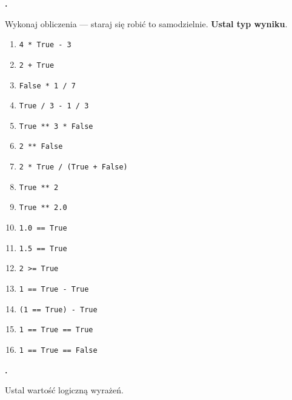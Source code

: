 \documentclass[a4paper]{article}
\begin{document}
\textbf{.}\addtocounter{zadanie}{1} Wykonaj obliczenia --- staraj się robić to samodzielnie. \textbf{Ustal typ wyniku}.

\begin{multicols}{2}
\begin{enumerate}[label=\arabic*.]
    \item \verb|4 * True - 3|
    \item \verb|2 + True|
    \item \verb|False * 1 / 7|
    \item \verb|True / 3 - 1 / 3|
    \item \verb|True ** 3 * False|
    \item \verb|2 ** False|
    \item \verb|2 * True / (True + False) |
    \item \verb|True ** 2|
    \item \verb|True ** 2.0|
    \item \verb|1.0 == True|
    \item \verb|1.5 == True|
    \item \verb|2 >= True|

    \item \verb|1 == True - True|
    \item \verb|(1 == True) - True|
    \item \verb|1 == True == True|
    \item \verb|1 == True == False|

\end{enumerate}
\end{multicols}

\textbf{.}\addtocounter{zadanie}{1} Ustal wartość logiczną wyrażeń.
\end{document}
